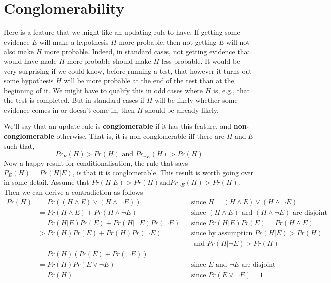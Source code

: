 \section{Conglomerability}
Here is a feature that we might like an updating rule to have. If getting some evidence $E$ will make a hypothesis $H$ more probable, then not getting $E$ will not also make $H$ more probable. Indeed, in standard cases, not getting evidence that would have made $H$ more probable should make $H$ less probable. It would be very surprising if we could know, before running a test, that however it turns out some hypothesis $H$ will be more probable at the end of the test than at the beginning of it. We might have to qualify this in odd cases where $H$ is, e.g., that the test is completed. But in standard cases if $H$ will be likely whether some evidence comes in or doesn't come in, then $H$ should be already likely.

We'll say that an update rule is \textbf{conglomerable} if it has this feature, and \textbf{non-con\-glom\-er\-able} otherwise. That is, it is non-conglomerable iff there are $H$ and $E$ such that,
\begin{equation*}
Pr_{E}(H) > Pr(H) \text{ and } Pr_{\neg E}(H) > Pr(H)
\end{equation*}
\noindent Now a happy result for conditionalisation, the rule that says $P_{E}(H) = Pr(H | E)$, is that it is conglomerable. This result is worth going over in some detail. Assume that $Pr(H|E) > Pr(H) \text{and} Pr_{\neg E}(H) > Pr(H)$. Then we can derive a contradiction as follows
\begin{align*}
	Pr(H) &= Pr((H \wedge E) \vee (H \wedge \neg E)) && \text{since } H = (H \wedge E) \vee (H \wedge \neg E) \\
	&= Pr(H \wedge E) + Pr (H \wedge \neg E)&& \text{since }(H \wedge E) \text{ and } (H \wedge \neg E) \text{ are disjoint} \\
	&= Pr(H|E)Pr(E) + Pr(H|\neg E)Pr(\neg E) && \text{since }Pr(H|E)Pr(E) = Pr(H \wedge E) \\
	&> Pr(H)Pr(E) + Pr(H)Pr(\neg E) && \text{since by assumption } Pr(H | E) > Pr(H) \\
	& && \text{ and } Pr(H | \neg E) > Pr(H) \\
	&= Pr(H)(Pr(E) + Pr(\neg E)) \\
	&= Pr(H)Pr(E \vee \neg E) && \text{since }E \text{ and } \neg E \text{ are disjoint} \\
	&= Pr(H)  && \text{since } Pr(E \vee \neg E) = 1
\end{align*}

